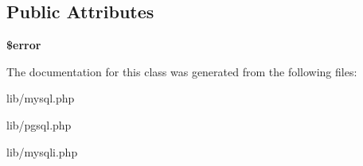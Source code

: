 \subsection*{Public Attributes}
\begin{DoxyCompactItemize}
\item 
\hypertarget{classstore_a72e10895f184f64e4fccb37473f8d749}{}{\bfseries \$error}\label{classstore_a72e10895f184f64e4fccb37473f8d749}

\end{DoxyCompactItemize}


The documentation for this class was generated from the following files\+:\begin{DoxyCompactItemize}
\item 
lib/mysql.\+php\item 
lib/pgsql.\+php\item 
lib/mysqli.\+php\end{DoxyCompactItemize}
